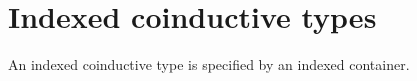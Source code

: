 \begin{comment}
\begin{defn}
Let $C:\mathsf{M}(A,B)\to\UU$ be a type family for which we have a term
\begin{equation*}
CH : \prd{a:A}{f:B(a)\to \mathsf{M}(A,B)}{y:C(\mathsf{cons}_{A,B}(a,f))}\prd{b:B(a)} C(f(b)).
\end{equation*}
Then we get the map
\begin{equation*}
c : (\sm{x:\mathsf{M}(A,B)}C(x))\to P_{A,B}(\sm{x:\mathsf{M}(A,B)}C(x)),
\end{equation*}
defined by
\begin{equation*}
c(\mathsf{cons}_{A,B}(a,f),y) \defeq \pairr{a, \lam{b}\pairr{f(b),CH(a,f,y,b)}},
\end{equation*}
for which the square
\begin{equation*}
\begin{tikzcd}[column sep=huge]
\sm{x:\mathsf{M}(A,B)}C(x) \arrow[r,"\proj 1"] \arrow[d,swap,"c"] & \mathsf{M}(A,B) \arrow[d,"\mathsf{destr}_{A,B}"] \\
P_{A,B}(\sm{x:\mathsf{M}(A,B)}C(x)) \arrow[r,swap,"P_{A,B}(\proj 1)"] & P_{A,B}(\mathsf{M}(A,B))
\end{tikzcd}
\end{equation*}
commutes. Then coalgebra homomorphisms
\begin{equation*}
\begin{tikzcd}[column sep=large]
\mathsf{M}(A,B) \arrow[d,swap,"\mathsf{destr}_{A,B}"] \arrow[r,"h"] & \sm{x:\mathsf{M}(A,B)}C(x) \arrow[d,"c"] \\
P_{A,B}(\mathsf{M}(A,B)) \arrow[r,swap,"P_{A,B}(h)"] & P_{A,B}(\sm{x:\mathsf{M}(A,B)}C(x)) 
\end{tikzcd}
\end{equation*}
define terms of type $\prd{x:\mathsf{M}(A,B)}C(x)$.
\end{defn} 

\begin{proof}[Construction]
Let $h$ be an coalgebra homomorphism of the indicated type. Since $\mathsf{M}(A,B)$
is the terminal coalgebra, it follows that $\proj 1\circ h=\idfunc$. Since
 we have an equivalence
\begin{equation*}
\eqv{\Big(\prd{x:\mathsf{M}(A,B)}C(x)\Big)}{\Big(\sm{g:\mathsf{M}(A,B)\to\sm{x:\mathsf{M}(A,B)}C(x)}\proj 1\circ g=\idfunc\Big)}
\end{equation*}
we get a section of $C$.
\end{proof}
\end{comment}

\section{Indexed coinductive types}
An indexed coinductive type is specified by an indexed container.

